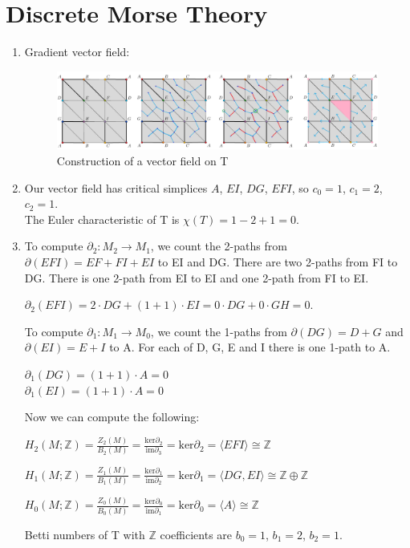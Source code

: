 \documentclass{article}
\begin{document}
\section{Discrete Morse Theory}\label{sec:p2}
\begin{enumerate}[label*=\alph*)]
    \item Gradient vector field:
        \begin{figure}[H]
            \centering
            \includegraphics[width=\textwidth]{2a.png}
            \caption{Construction of a vector field on T}\label{fig:2a}
        \end{figure}
    \item Our vector field has critical simplices $A$, $EI$, $DG$, $EFI$, so $c_0 = 1$, $c_1 = 2$, $c_2 = 1$.\\
    The Euler characteristic of T is $\chi(T) = 1 - 2 + 1 = 0$.
    \item To compute $\partial_2: M_2 \rightarrow M_1$, we count the 2-paths from $\partial(EFI) = EF + FI + EI$ to EI and DG. There are two 2-paths from FI to DG. There is one 2-path from EI to EI and one 2-path from FI to EI.
    
    $\partial_2(EFI) = 2 \cdot DG + (1 + 1) \cdot EI = 0 \cdot DG + 0 \cdot GH = 0$.

    To compute $\partial_1: M_1 \rightarrow M_0$, we count the 1-paths from $\partial(DG) = D + G$ and $\partial(EI) = E + I$ to A. For each of D, G, E and I there is one 1-path to A.
    
    $\partial_1(DG) = (1 + 1) \cdot A = 0 $\\
    $\partial_1(EI) = (1 + 1) \cdot A = 0 $
    
    Now we can compute the following:
    
    $H_2(M;\mathbb{Z}) = \frac{Z_2(M)}{B_2(M)} = \frac{\text{ker}\partial_2}{\text{im}\partial_3} = \text{ker}\partial_2 = \langle EFI \rangle \cong \mathbb{Z}$
    
    $H_1(M;\mathbb{Z}) = \frac{Z_1(M)}{B_1(M)} = \frac{\text{ker}\partial_1}{\text{im}\partial_2} = \text{ker}\partial_1 = \langle DG, EI \rangle \cong \mathbb{Z} \oplus \mathbb{Z}$
    
    $H_0(M;\mathbb{Z}) = \frac{Z_0(M)}{B_0(M)} = \frac{\text{ker}\partial_0}{\text{im}\partial_1} = \text{ker}\partial_0 = \langle A \rangle \cong \mathbb{Z}$



    Betti numbers of T with $\mathbb{Z}$ coefficients are $b_0 = 1$, $b_1 = 2$, $b_2 = 1$.
\end{enumerate}
\end{document}

